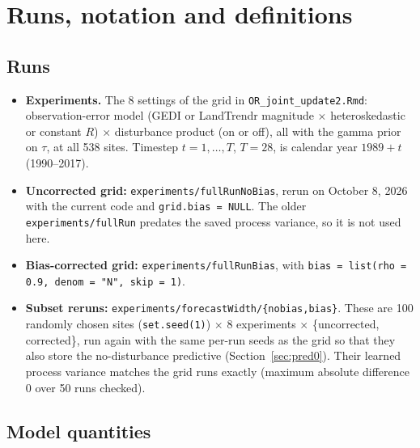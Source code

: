 \documentclass[11pt]{article}
\newcommand{\code}[1]{\texttt{#1}}
\begin{document}
\section{Runs, notation and definitions}
\label{sec:defs}

\subsection{Runs}

\begin{itemize}
  \item \textbf{Experiments.} The 8 settings of the grid in \code{OR\_joint\_update2.Rmd}: observation-error
  model (GEDI or LandTrendr magnitude $\times$ heteroskedastic or constant $R$) $\times$
  disturbance product (on or off), all with the gamma prior on $\tau$, at all
  538 sites. Timestep $t = 1,\dots,T$, $T = 28$, is calendar year $1989 + t$
  (1990--2017).
  \item \textbf{Uncorrected grid:} \code{experiments/fullRunNoBias}, rerun on October 8, 2026 with
  the current code and \code{grid.bias = NULL}. The older \code{experiments/fullRun}
  predates the saved process variance, so it is not used here.
  \item \textbf{Bias-corrected grid:} \code{experiments/fullRunBias}, with
  \code{bias = list(rho = 0.9, denom = "N", skip = 1)}.
  \item \textbf{Subset reruns:} \code{experiments/forecastWidth/\{nobias,bias\}}. These are 100 randomly chosen
  sites (\code{set.seed(1)}) $\times$ 8 experiments $\times$ \{uncorrected, corrected\}, run again with
  the same per-run seeds as the grid so that they also store the no-disturbance predictive
  (Section~\ref{sec:pred0}). Their learned process variance matches the grid runs exactly
  (maximum absolute difference 0 over 50 runs checked).
\end{itemize}

\subsection{Model quantities}
\end{document}
